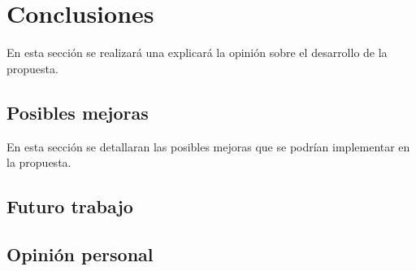 
\chapter{Conclusiones}

En esta sección se realizará una explicará la opinión sobre el desarrollo de la propuesta.

\section{Posibles mejoras}
En esta sección se detallaran las posibles mejoras que se podrían implementar en la propuesta.


\section{Futuro trabajo}


\section{Opinión personal}